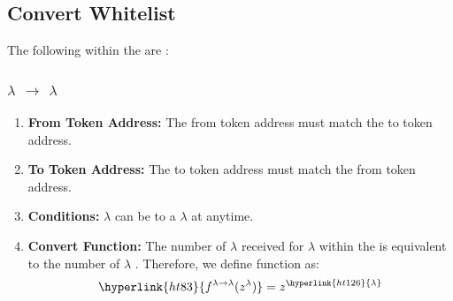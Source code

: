 \documentclass[class=article, crop=false]{standalone}
\begin{document}
\subsection{Convert Whitelist} 

The following  within the  are :
\subsubsection{$\lambda$ $\rightarrow$ $\lambda$}
    \begin{enumerate}
        \item \textbf{From Token Address:} The from token address must match the to token address.
        \item \textbf{To Token Address:} The to token address must match the from token address.
        \item \textbf{Conditions:}  \hyperlink{ht126}{$\lambda$} can be  to a \hyperlink{ht126}{$\lambda$}  at anytime. 
        \item \textbf{Convert Function:} The number of \hyperlink{ht126}{$\lambda$} received for   \hyperlink{ht126}{$\lambda$} within the  is equivalent to the number of \hyperlink{ht126}{$\lambda$} . Therefore, we define function as:
$$\hyperlink{ht83}{f^{\lambda \rightarrow \lambda}(z^{\lambda})} = z^{\hyperlink{ht126}{\lambda}}$$

    \end{enumerate}
\end{document}
